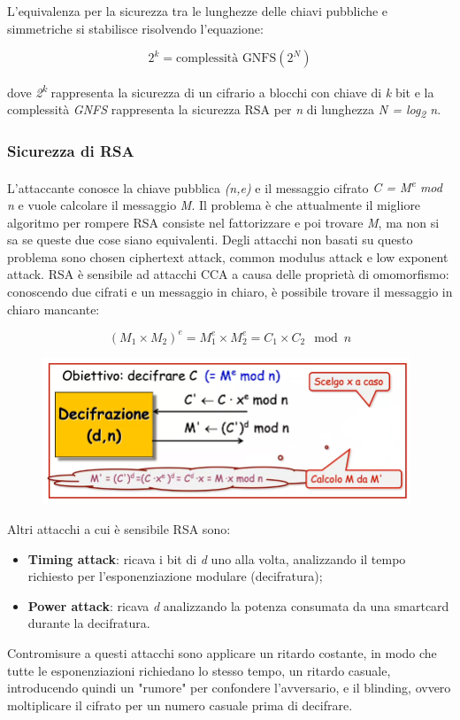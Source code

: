 L'equivalenza per la sicurezza tra le lunghezze delle chiavi pubbliche e simmetriche si stabilisce risolvendo l'equazione:

\[2^{k} = \text{complessità GNFS} (2^{N})\]

dove \textit{2\textsuperscript{k}} rappresenta la sicurezza di un cifrario a blocchi con chiave di \textit{k} bit e la complessità \textit{GNFS} rappresenta la sicurezza RSA per \textit{n} di lunghezza \textit{N = log\textsubscript{2} n}.

\subsubsection{Sicurezza di RSA}
L'attaccante conosce la chiave pubblica \textit{(n,e)} e il messaggio cifrato \textit{C = M\textsuperscript{e} mod n} e vuole calcolare il messaggio \textit{M}. Il problema è che attualmente il migliore algoritmo per rompere RSA consiste nel fattorizzare e poi trovare \textit{M}, ma non si sa se queste due cose siano equivalenti. Degli attacchi non basati su questo problema sono chosen ciphertext attack, common modulus attack e low exponent attack. RSA è sensibile ad attacchi CCA a causa delle proprietà di omomorfismo: conoscendo due cifrati e un messaggio in chiaro, è possibile trovare il messaggio in chiaro mancante:

\[(M_{1} \times M_{2})^{e} = M_{1}^{e} \times M_{2}^{e} = C_{1} \times C_{2} \mod n\]

\begin{figure}[htb!]
    \centering
    \includegraphics[width=11cm]{./Images/cap1/1.47.png}
\end{figure} 

Altri attacchi a cui è sensibile RSA sono:
\begin{itemize}
    \item \textbf{Timing attack}: ricava i bit di \textit{d}  uno alla volta, analizzando il tempo richiesto per l'esponenziazione modulare (decifratura);
    \item \textbf{Power attack}: ricava \textit{d} analizzando la potenza consumata da una smartcard durante la decifratura. 
\end{itemize}
Contromisure a questi attacchi sono applicare un ritardo costante, in modo che tutte le esponenziazioni richiedano lo stesso tempo, un ritardo casuale, introducendo quindi un "rumore" per confondere l'avversario, e il blinding, ovvero moltiplicare il cifrato per un numero casuale prima di decifrare.

